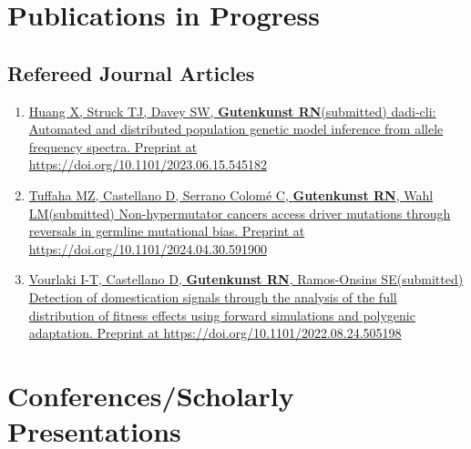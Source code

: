 \documentclass[11pt]{article}
\begin{document}

\section*{Publications in Progress}
\subsection*{Refereed Journal Articles}
\begin{enumerate}

\item \href{https://doi.org/10.1101/2023.06.15.545182}{Huang X\trainee\equal\corresponding, Struck TJ\trainee\equal, Davey SW, \textbf{Gutenkunst RN}\corresponding (submitted) dadi-cli: Automated and distributed population genetic model inference from allele frequency spectra. Preprint at\\https://doi.org/10.1101/2023.06.15.545182}

\item \href{https://doi.org/10.1101/2024.04.30.591900}{Tuffaha MZ, Castellano D\trainee, Serrano Colom\'e C, \textbf{Gutenkunst RN}, Wahl LM\corresponding (submitted) Non-hypermutator cancers access driver mutations through reversals in germline mutational bias. Preprint at https://doi.org/10.1101/2024.04.30.591900}

\item \href{https://doi.org/10.1101/2022.08.24.505198}{Vourlaki I-T\equal, Castellano D\trainee\equal, \textbf{Gutenkunst RN}\corresponding, Ramos-Onsins SE\corresponding (submitted) Detection of domestication signals through the analysis of the full distribution of fitness effects using forward simulations and polygenic adaptation. Preprint at https://doi.org/10.1101/2022.08.24.505198}

\end{enumerate}

\section*{Conferences/Scholarly Presentations}
\end{document}
